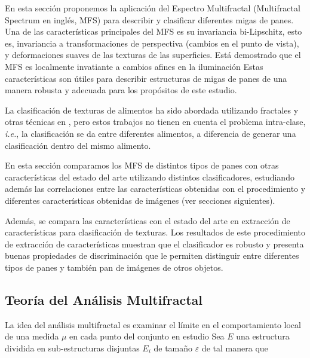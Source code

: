 En esta sección proponemos la aplicación del Espectro Multifractal (Multifractal Spectrum en inglés, MFS) para describir y clasificar diferentes migas de panes.
Una de las características principales del MFS es su invariancia bi-Lipschitz, esto es,
invariancia a transformaciones de perspectiva (cambios en el punto de vista), y deformaciones suaves de las texturas de las superficies.
Está demostrado que el MFS es localmente invatiante a cambios afines en la iluminación
Estas características son útiles para describir estructuras de migas de panes de una manera robusta y adecuada para los propósitos de este estudio.


La clasificación de texturas de alimentos ha sido abordada utilizando fractales y otras técnicas en \cite{Zong2010,Bosch2011}, pero estos trabajos no tienen en cuenta el problema intra-clase, {\em i.e.}, la clasificación se da entre diferentes alimentos, a diferencia de generar una clasificación dentro del mismo alimento.


En esta sección comparamos los MFS de distintos tipos de panes con otras características del estado del arte utilizando distintos clasificadores, estudiando además las correlaciones entre las características obtenidas con el procedimiento y diferentes características obtenidas de imágenes (ver secciones siguientes).

Además, se compara las características con el estado del arte en extracción de características para clasificación de texturas.
Los resultados de este procedimiento de extracción de características muestran que el clasificador es robusto y presenta buenas propiedades de discriminación que le permiten distinguir entre diferentes tipos de panes y también pan de imágenes de otros objetos.

\subsection{Teoría del Análisis Multifractal}

La idea del análisis multifractal es examinar el límite en el comportamiento local de una medida $\mu$ en cada punto del conjunto en estudio
Sea $E$ una estructura dividida en sub-estructuras disjuntas $E_{i}$ de tamaño $\varepsilon$ de tal manera que

